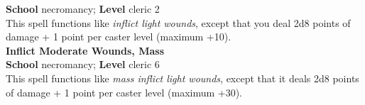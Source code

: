 \textbf{School} necromancy; \textbf{Level} cleric 2\\
This spell functions like \textit{inflict light wounds}, except that you deal 2d8 points of damage + 1 point per caster level (maximum +10).\\
\textbf{Inflict Moderate Wounds, Mass}\\
\textbf{School} necromancy; \textbf{Level} cleric 6\\
This spell functions like \textit{mass inflict light wounds}, except that it deals 2d8 points of damage + 1 point per caster level (maximum +30).\\
